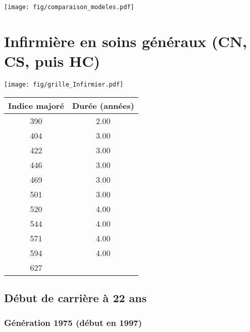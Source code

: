 
 \begin{center}\texttt{[image: fig/comparaison\_modeles.pdf]}\end{center} 

\newpage 
 
\chapter{Infirmière en soins généraux (CN, CS, puis HC)} 

\begin{minipage}{0.55\linewidth}\texttt{[image: fig/grille\_Infirmier.pdf]}\end{minipage} 
\begin{minipage}{0.3\linewidth} 
 \begin{center} 

\begin{tabular}[htb]{|c|c|} 
\hline 
 Indice majoré &  Durée (années) \\ 
\hline \hline 
 390 &  2.00 \\ 
\hline 
 404 &  3.00 \\ 
\hline 
 422 &  3.00 \\ 
\hline 
 446 &  3.00 \\ 
\hline 
 469 &  3.00 \\ 
\hline 
 501 &  3.00 \\ 
\hline 
 520 &  4.00 \\ 
\hline 
 544 &  4.00 \\ 
\hline 
 571 &  4.00 \\ 
\hline 
 594 &  4.00 \\ 
\hline 
 627 &   \\ 
\hline 
\hline 
\end{tabular} 
\end{center} 
 \end{minipage} 


 \addto{\captionsenglish}{ \renewcommand{\mtctitle}{}} \setcounter{minitocdepth}{2} 
 \minitoc \newpage 

\section{Début de carrière à 22 ans} 

\subsection{Génération 1975 (début en 1997)} 

